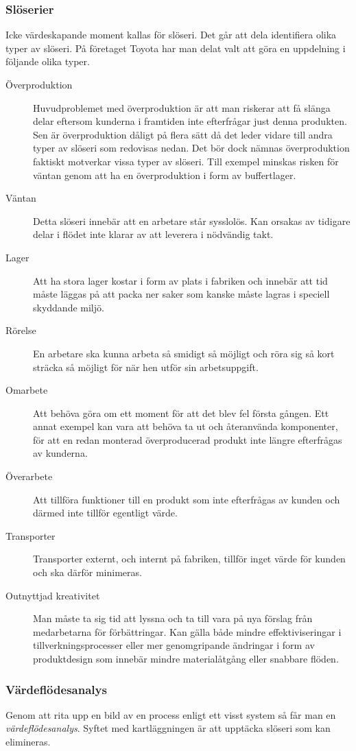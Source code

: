 \documentclass{article}
\begin{document}
\subsubsection*{Slöserier}
Icke värdeskapande moment kallas för slöseri. Det går att dela identifiera olika typer av slöseri. På företaget Toyota har man delat valt att göra en uppdelning i följande olika typer. 
\begin{description}
\item[Överproduktion]
Huvudproblemet med överproduktion är att man riskerar att få slänga delar eftersom kunderna i framtiden inte efterfrågar just denna produkten. Sen är överproduktion dåligt på flera sätt då det leder vidare till andra typer av slöseri som redovisas nedan. Det bör dock nämnas överproduktion faktiskt motverkar vissa typer av slöseri. Till exempel minskas risken för väntan genom att ha en överproduktion i form av buffertlager.
\item[Väntan]
Detta slöseri innebär att en arbetare står sysslolös. Kan orsakas av tidigare delar i flödet inte klarar av att leverera i nödvändig takt.
\item[Lager]
Att ha stora lager kostar i form av plats i fabriken och innebär att tid måste läggas på att packa ner saker som kanske måste lagras i speciell skyddande miljö. 
\item[Rörelse]
En arbetare ska kunna arbeta så smidigt så möjligt och röra sig så kort sträcka så möjligt för när hen utför sin arbetsuppgift.
\item[Omarbete]
Att behöva göra om ett moment för att det blev fel första gången. Ett annat exempel kan vara att behöva ta ut och återanvända komponenter, för att en redan monterad överproducerad produkt inte längre efterfrågas av kunderna.
\item[Överarbete]
Att tillföra funktioner till en produkt som inte efterfrågas av kunden och därmed inte tillför egentligt värde.
\item[Transporter]
Transporter externt, och internt på fabriken, tillför inget värde för kunden och ska därför minimeras.
\item[Outnyttjad kreativitet]
Man måste ta sig tid att lyssna och ta till vara på nya förslag från medarbetarna för förbättringar. Kan gälla både mindre effektiviseringar i tillverkningsprocesser eller mer genomgripande ändringar i form av produktdesign som innebär mindre materialåtgång eller snabbare flöden.  
\end{description}

\subsubsection*{Värdeflödesanalys}
Genom att rita upp en bild av en process enligt ett visst system så får man en \emph{värdeflödesanalys}. Syftet med kartläggningen är att upptäcka slöseri som kan elimineras.
\end{document}

